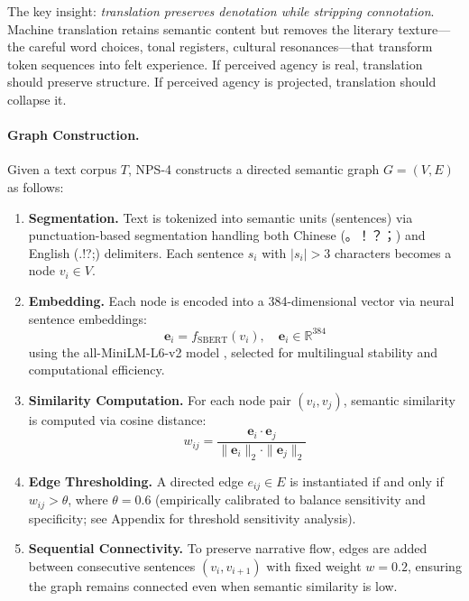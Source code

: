 \documentclass[11pt, a4paper, oneside]{article}
\theoremstyle{analytic}
\begin{document}
The key insight: \textit{translation preserves denotation while stripping connotation}. Machine translation retains semantic content but removes the literary texture---the careful word choices, tonal registers, cultural resonances---that transform token sequences into felt experience. If perceived agency is real, translation should preserve structure. If perceived agency is projected, translation should collapse it.

\paragraph{Graph Construction.}
Given a text corpus $T$, NPS-4 constructs a directed semantic graph $G = (V, E)$ as follows:

\begin{enumerate}
    \item \textbf{Segmentation.} Text is tokenized into semantic units (sentences) via punctuation-based segmentation handling both Chinese (。！？；) and English (.!?;) delimiters. Each sentence $s_i$ with $|s_i| > 3$ characters becomes a node $v_i \in V$.

    \item \textbf{Embedding.} Each node is encoded into a 384-dimensional vector via neural sentence embeddings:
    \begin{equation}
        \mathbf{e}_i = f_{\text{SBERT}}(v_i), \quad \mathbf{e}_i \in \mathbb{R}^{384}
    \end{equation}
    using the all-MiniLM-L6-v2 model \citep{reimers2019sentence}, selected for multilingual stability and computational efficiency.

    \item \textbf{Similarity Computation.} For each node pair $(v_i, v_j)$, semantic similarity is computed via cosine distance:
    \begin{equation}
        w_{ij} = \frac{\mathbf{e}_i \cdot \mathbf{e}_j}{\|\mathbf{e}_i\|_2 \cdot \|\mathbf{e}_j\|_2}
    \end{equation}

    \item \textbf{Edge Thresholding.} A directed edge $e_{ij} \in E$ is instantiated if and only if $w_{ij} > \theta$, where $\theta = 0.6$ (empirically calibrated to balance sensitivity and specificity; see Appendix for threshold sensitivity analysis).

    \item \textbf{Sequential Connectivity.} To preserve narrative flow, edges are added between consecutive sentences $(v_i, v_{i+1})$ with fixed weight $w = 0.2$, ensuring the graph remains connected even when semantic similarity is low.
\end{enumerate}
\end{document}
